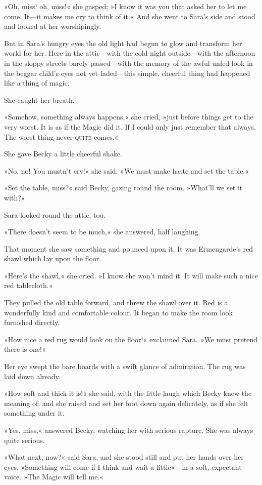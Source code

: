 »Oh, miss! oh, miss!« she gasped; »I know it was you that asked her to let me come. It—it makes me cry to think of it.« And she went to Sara's side and stood and looked at her worshipingly.

But in Sara's hungry eyes the old light had begun to glow and transform her world for her. Here in the attic—with the cold night outside—with the afternoon in the sloppy streets barely passed—with the memory of the awful unfed look in the beggar child's eyes not yet faded—this simple, cheerful thing had happened like a thing of magic.

She caught her breath.

»Somehow, something always happens,« she cried, »just before things get to the very worst. It is as if the Magic did it. If I could only just remember that always. The worst thing never \textsc{quite} comes.«

She gave Becky a little cheerful shake.

»No, no! You mustn't cry!« she said. »We must make haste and set the table.«

»Set the table, miss?« said Becky, gazing round the room. »What'll we set it with?«

Sara looked round the attic, too.

»There doesn't seem to be much,« she answered, half laughing.

That moment she saw something and pounced upon it. It was Ermengarde's red shawl which lay upon the floor.

»Here's the shawl,« she cried. »I know she won't mind it. It will make such a nice red tablecloth.«

They pulled the old table forward, and threw the shawl over it. Red is a wonderfully kind and comfortable colour. It began to make the room look furnished directly.

»How nice a red rug would look on the floor!« exclaimed Sara. »We must pretend there is one!«

Her eye swept the bare boards with a swift glance of admiration. The rug was laid down already.

»How soft and thick it is!« she said, with the little laugh which Becky knew the meaning of; and she raised and set her foot down again delicately, as if she felt something under it.

»Yes, miss,« answered Becky, watching her with serious rapture. She was always quite serious.

»What next, now?« said Sara, and she stood still and put her hands over her eyes. »Something will come if I think and wait a little«—in a soft, expectant voice. »The Magic will tell me.«

